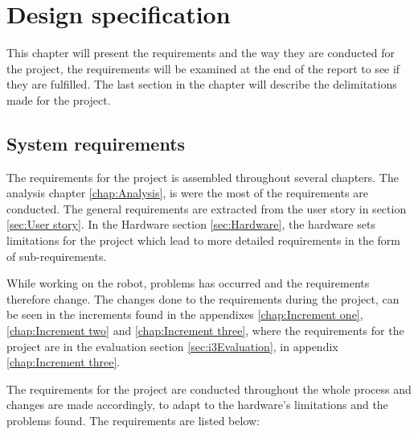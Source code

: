 \chapter{Design specification}
\label{chap:Design specification}
This chapter will present the requirements and the way they are conducted for the project, the requirements will be examined at the end of the report to see if they are fulfilled. The last section in the chapter will describe the delimitations made for the project.


\section{System requirements}
\label{sec:System requirements}
The requirements for the project is assembled throughout several chapters. The analysis chapter \ref{chap:Analysis}, is were the most of the requirements are conducted. The general requirements are extracted from the user story in section \ref{sec:User story}. In the Hardware section \ref{sec:Hardware}, the hardware sets limitations for the project which lead to more detailed requirements in the form of sub-requirements.


While working on the robot, problems has occurred and the requirements therefore change. The changes done to the requirements during the project, can be seen in the increments found in the appendixes \ref{chap:Increment one}, \ref{chap:Increment two} and \ref{chap:Increment three}, where the requirements for the project are in the evaluation section \ref{sec:i3Evaluation}, in appendix \ref{chap:Increment three}.


The requirements for the project are conducted throughout the whole process and changes are made accordingly, to adapt to the hardware's limitations and the problems found. The requirements are listed below: 


